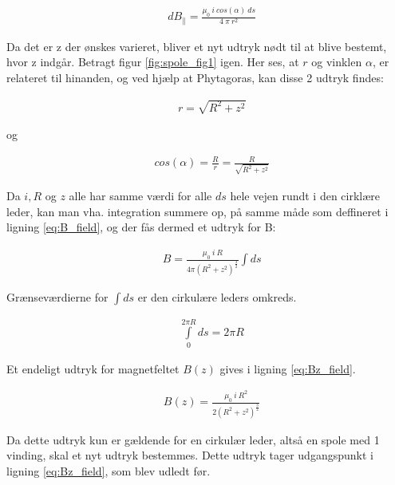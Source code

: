 \begin{align}
&dB_\parallel=\frac{\mu_0 \:i\: cos(\alpha)\:ds}{4\:\pi\: r^2}
\end{align}

Da det er z der ønskes varieret, bliver et nyt udtryk nødt til at blive bestemt, hvor z indgår. Betragt figur \ref{fig:spole_fig1} igen. Her ses, at $r$ og vinklen $\alpha$, er relateret til hinanden, og ved hjælp at Phytagoras, kan disse 2 udtryk findes:


\begin{align}
&r=\sqrt{R^2+z^2}
\end{align}

og

\begin{align}
&cos(\alpha)=\frac{R}{r}=\frac{R}{\sqrt{R^2+z^2}}
\end{align}

Da $i, R$ og $z$ alle har samme værdi for alle $ds$ hele vejen rundt i den cirklære leder, kan man vha. integration summere op, på samme måde som deffineret i ligning \ref{eq:B_field}, og der fås dermed et udtryk for B:



\begin{align}
&B=\frac{\mu_0 \: i \: R}{4\pi(R^2+z^2)^\frac{3}{2}}\int ds
\end{align}

Grænseværdierne for $\int ds$ er den cirkulære leders omkreds.

\begin{align}
&\int\limits_{0}^{2\pi R} ds = 2\pi R
\end{align}

Et endeligt udtryk for magnetfeltet $B(z)$ gives i ligning \ref{eq:Bz_field}.

\begin{align}
	&B(z)=\frac{\mu_0 \: i \: R^2}{2(R^2+z^2)^\frac{3}{2}} \label{eq:Bz_field}
\end{align}


Da dette udtryk kun er gældende for en cirkulær leder, altså en spole med 1 vinding, skal et nyt udtryk bestemmes. Dette udtryk tager udgangspunkt i ligning \ref{eq:Bz_field}, som blev udledt før.

